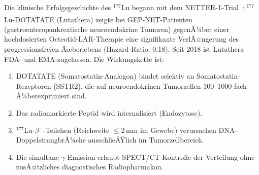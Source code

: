 ﻿\documentclass[12pt, a4paper]{report}
\theoremstyle{definition}
\theoremstyle{remark}
\begin{document}
Die klinische Erfolgsgeschichte des $^{177}$Lu begann mit dem
NETTER-1-Trial~\cite{strosberg2017}: $^{177}$Lu-DOTATATE (Lutathera\textsuperscript{\textregistered})
zeigte bei GEP-NET-Patienten (gastroenteropankreatische neuroendokrine Tumoren)
gegenÃ¼ber einer hochdosierten Octeotid-LAR-Therapie eine signifikante
VerlÃ¤ngerung des progressionsfreien Ãœberlebens (Hazard Ratio: 0.18). Seit
2018 ist Lutathera FDA- und EMA-zugelassen. Die Wirkungskette ist:
\begin{enumerate}[label=\arabic*.]
  \item DOTATATE (Somatostatin-Analogon) bindet selektiv an Somatostatin-Rezeptoren
        (SSTR2), die auf neuroendokrinen Tumorzellen $100$--$1000$-fach
        Ã¼berexprimiert sind.
  \item Das radiomarkierte Peptid wird internalisiert (Endozytose).
  \item $^{177}$Lu-$\beta^-$-Teilchen (Reichweite $\leq 2\,\text{mm}$ im Gewebe)
        verursachen DNA-Doppelstrang\-brÃ¼che ausschlieÃŸlich im Tumorzellbereich.
  \item Die simultane $\gamma$-Emission erlaubt SPECT/CT-Kontrolle der
        Verteilung ohne zusÃ¤tzliches diagnostisches Radiopharmakon.
\end{enumerate}
\end{document}
